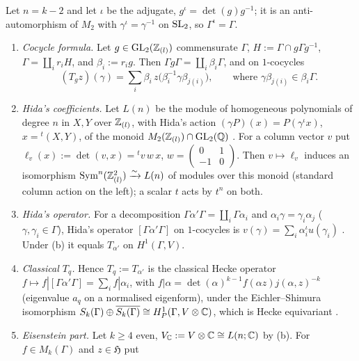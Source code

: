 \begin{lemma}\label{lem:s03-Tclassical}
Let $n=k-2$ and let $\iota$ be the adjugate, $g^\iota=\det(g)g^{-1}$; it is an anti-automorphism of $M_2$ with $\gamma^\iota=\gamma^{-1}$ on $\mathrm{SL}_2$, so $\Gamma^\iota=\Gamma$.
\begin{enumerate}[label=(\alph*)]
\item \emph{Cocycle formula.} Let $g\in\mathrm{GL}_2(\mathbb{Z}_{(l)})$ commensurate $\Gamma$, $H:=\Gamma\cap g\Gamma g^{-1}$, $\Gamma=\coprod_ir_iH$, and $\beta_i:=r_ig$. Then
  $\Gamma g\Gamma=\coprod_i\beta_i\Gamma$, and on $1$-cocycles
  \[(T_gz)(\gamma)=\sum_i\beta_i\,z\big(\beta_i^{-1}\gamma\beta_{j(i)}\big),\qquad\text{where }\gamma\beta_{j(i)}\in\beta_i\Gamma.\]
\item \emph{Hida's coefficients.} Let $L(n)$ be the module of homogeneous polynomials of degree $n$ in $X,Y$ over $\mathbb{Z}_{(l)}$, with Hida's action
  $(\gamma P)(x)=P(\gamma^\iota x)$, $x={}^{t}(X,Y)$, of the monoid $M_2(\mathbb{Z}_{(l)})\cap\mathrm{GL}_2(\mathbb{Q})$
  . For a column vector $v$ put $\ell_v(x):=\det(v,x)={}^{t}v\,w\,x$,
  $w=\left(\begin{smallmatrix}0&1\\-1&0\end{smallmatrix}\right)$. Then $v\mapsto\ell_v$ induces an isomorphism $\mathrm{Sym}^n(\mathbb{Z}_{(l)}^2)\xrightarrow\sim L(n)$ of modules over
  this monoid (standard column action on the left); a scalar $t$ acts by $t^n$ on both.
\item \emph{Hida's operator.} For a decomposition $\Gamma\alpha'\Gamma=\coprod_i\Gamma\alpha_i$ and $\alpha_i\gamma=\gamma_i\alpha_{j}$ ($\gamma,\gamma_i\in\Gamma$),
  Hida's operator $[\Gamma\alpha'\Gamma]$ on $1$-cocycles is $v(\gamma)=\sum_i\alpha_i^\iota u(\gamma_i)$
  . Under (b) it equals $T_{\alpha'}$ on $H^1(\Gamma,V)$.
\item \emph{Classical $T_q$.} Hence $T_q:=T_{\alpha'}$ is the classical Hecke operator $f\mapsto f|[\Gamma\alpha'\Gamma]=\sum_if|\alpha_i$, with
  $f|\alpha=\det(\alpha)^{k-1}f(\alpha z)j(\alpha,z)^{-k}$ (eigenvalue $a_q$ on a normalised eigenform), under the Eichler--Shimura isomorphism
  $S_k(\Gamma)\oplus\overline{S_k(\Gamma)}\cong H^1_P(\Gamma,V\otimes\mathbb{C})$, which is Hecke equivariant
  .
\item \emph{Eisenstein part.} Let $k\ge4$ even, $V_{\mathbb{C}}:=V\otimes\mathbb{C}\cong L(n;\mathbb{C})$ by (b). For $f\in M_k(\Gamma)$ and $z\in\mathfrak H$ put

\end{enumerate}
\end{lemma}
